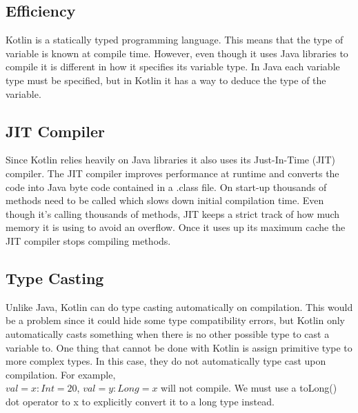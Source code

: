 \begin{center}
\section{Efficiency}
\end{center}
\hspace{1em}Kotlin is a statically typed programming language. This means that the type of variable is known at compile time. However, even though it uses Java libraries to compile it is different in how it specifies its variable type. In Java each variable type must be specified, but in Kotlin it has a way to deduce the type of the variable. 

\subsection{JIT Compiler}
\hspace{1em}Since Kotlin relies heavily on Java libraries it also uses its Just-In-Time (JIT) compiler. The JIT compiler improves performance at runtime and converts the code into Java byte code contained in a .class file. On start-up thousands of methods need to be called which slows down initial compilation time. Even though it's calling thousands of methods, JIT keeps a strict track of how much memory it is using to avoid an overflow. Once it uses up its maximum cache the JIT compiler stops compiling methods. 

\subsection{Type Casting}
\hspace{1em}Unlike Java, Kotlin can do type casting automatically on compilation. This would be a problem since it could hide some type compatibility errors, but Kotlin only automatically casts something when there is no other possible type to cast a variable to. One thing that cannot be done with Kotlin is assign primitive type to more complex types. In this case, they do not automatically type cast upon compilation. For example, \\$val=x:Int = 20$, $val=y:Long =x$ will not compile. We must use a toLong() dot operator to x to explicitly convert it to a long type instead.

